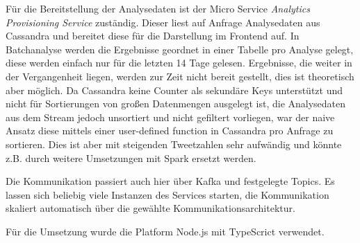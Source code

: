 Für die Bereitstellung der Analysedaten ist der Micro Service \textit{Analytics Provisioning Service} zuständig. 
Dieser liest auf Anfrage Analysedaten aus Cassandra und bereitet diese für die Darstellung im Frontend auf.
In Batchanalyse werden die Ergebnisse geordnet in einer Tabelle pro Analyse gelegt, diese werden einfach nur für die letzten 14 Tage gelesen. Ergebnisse, die weiter in der Vergangenheit liegen, werden zur Zeit nicht bereit gestellt, dies ist theoretisch aber möglich.
Da Cassandra keine Counter als sekundäre Keys unterstützt und nicht für Sortierungen von großen Datenmengen ausgelegt ist,
die Analysedaten aus dem Stream jedoch unsortiert und nicht gefiltert vorliegen, war der naive Ansatz diese mittels einer  user-defined function in Cassandra pro Anfrage zu sortieren. Dies ist aber mit steigenden Tweetzahlen sehr aufwändig und könnte z.B. durch weitere Umsetzungen mit Spark ersetzt werden.

Die Kommunikation passiert auch hier über Kafka und festgelegte Topics.
Es lassen sich beliebig viele Instanzen des Services starten, die Kommunikation skaliert automatisch über die gewählte Kommunikationsarchitektur.

Für die Umsetzung wurde die Platform Node.js mit TypeScrict verwendet. 